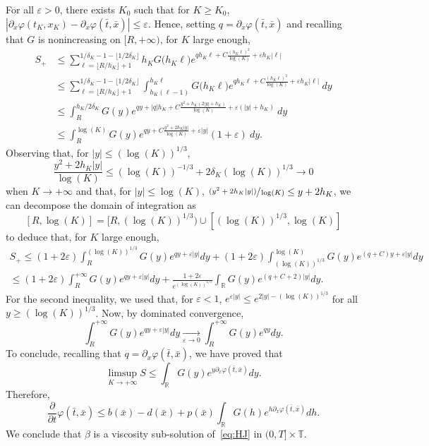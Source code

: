 \documentclass[10pt]{amsart}
\let\epsilon\varepsilon
\newcommand{\psfrac}[2]{\sfrac{(#1)}{#2}}
\theoremstyle{plain}
\theoremstyle{remark}
\newcommand\T{\mathbb{T}}
\newcommand\R{\mathbb{R}}
\begin{document}
For all $\varepsilon>0$, there exists $K_0$ such that for $K\geq K_0$, $|\partial_x\varphi(t_K,x_K)-\partial_x\varphi(\bar{t},\bar{x})| \leq \varepsilon$. Hence, setting $q=\partial_x\varphi(\bar{t},\bar{x})$ and recalling that $G$ is nonincreasing on $[R,+\infty)$, for $K$ large enough,\vspace*{-3pt}\enlargethispage{\baselineskip}
\begin{align*}
S_+ & \leq \sum_{\ell= \lfloor R/h_K \rfloor +1}^{1/\delta_K-1-\lfloor 1/2\delta_K\rfloor} h_K G\big(h_K\ell \big)e^{qh_K\ell+C\frac{(h_K\ell)^2}{\log(K)}+\varepsilon h_K|\ell|} \\
& \leq \sum_{\ell=\lfloor R/h_K \rfloor +1}^{1/\delta_K-1-\lfloor 1/2\delta_K\rfloor} \int_{h_K(\ell-1)}^{h_K\ell } G\big(h_K\ell \big)e^{q h_K\ell+C\frac{(h_K\ell)^2}{\log(K)}+\varepsilon h_K|\ell|} \ dy\\
& \leq \int_{R}^{h_K/2\delta_K} G(y) e^{q y+|q|h_K+C\frac{y^2+h_K(2|y|+h_K)}{\log(K)}+\varepsilon (|y|+h_K)}\ dy \\
& \leq \int_{R}^{\log(K)} G(y) e^{q y+C\frac{y^2+2h_K|y|}{\log(K)}+\varepsilon |y|}(1+\varepsilon)\ dy.
\end{align*}
Observing that, for $|y|\leq (\log(K))^{1/3}$,\vspace*{-3pt}
\[\frac{y^2+2h_K|y|}{\log(K)}\leq (\log(K))^{-1/3}+2\delta_K(\log(K))^{1/3}\to 0\]
when $K\to+\infty$ and that, for $|y|\leq \log(K)$, $\psfrac{y^2+2h_K|y|}{\log(K)}\leq y+2h_K$, we can decompose the domain of integration as
\[[R,\log(K)]=[R,(\log(K))^{1/3})\cup[(\log(K))^{1/3},\log(K)]\]to deduce that, for $K$ large enough,\vspace*{-3pt}
\begin{multline*}
S_+ \leq (1+2\varepsilon)\int_{R}^{(\log(K))^{1/3}}G(y)e^{q y+\varepsilon|y|}dy +(1+2\epsilon)\int_{(\log(K))^{1/3}}^{\log(K)}G(y) e^{(q+C)y+\varepsilon|y|}dy \\
\leq(1+2\varepsilon)\int_{R}^{+\infty}G(y)e^{q y+\varepsilon|y|}dy+\frac{1+2\epsilon}{e^{(\log(K))^{1/3}}}\int_\mathbb{R} G(y) e^{(q+C+2)|y|}dy.
\end{multline*}
For the second inequality, we used that, for $\varepsilon<1$, $e^{\varepsilon|y|}\leq e^{2|y|-(\log (K))^{1/3}}$ for all $y\geq (\log (K))^{1/3}$. Now, by dominated convergence,\vspace*{-3pt}
\[
\int_{R}^{+\infty}G(y)e^{q y+\varepsilon|y|}dy\xrightarrow[\varepsilon\to 0]{}\int_{R}^{+\infty}G(y)e^{q y}dy.
\]
To conclude, recalling that $q=\partial_x\varphi(\bar{t},\bar{x})$, we have proved that\vspace*{-3pt}
\[
\limsup_{K\to+\infty} S\leq \int_\mathbb{R}G(y)e^{ y\partial_x\varphi(\bar{t},\bar{x})}dy.
\]
Therefore,\vspace*{-3pt}
\[
\frac{\partial}{\partial t}\varphi(\bar{t},\bar{x})\leq b(\bar x)-d(\bar x)+p(\bar x)\int_{\R} G(h) e^{h\partial_x\varphi(\bar{t},\bar{x})}dh.
\]
We conclude that $\beta$ is a viscosity sub-solution of~\eqref{eq:HJ} in $(0,T]\times \T$.
\end{document}
